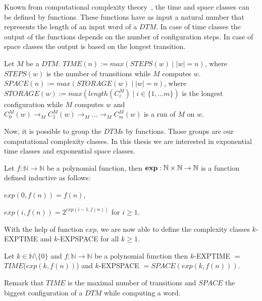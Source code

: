 Known from computational complexity theory~\cite{papadimitriou1994complexity}, the time and space classes
can be defined by functions. These functions have as input a natural number that represents the length of an input
word of a $\mathit{DTM}$. In case of time classes the output of the functions depends on the number of configuration
steps. In case of space classes the output is based on the longest transition.

\begin{definition}
    Let $M$ be a $\mathit{DTM}$. $\mathit{TIME}(n):= max(\mathit{STEPS}(w)\mid |w| = n)$, where $\mathit{STEPS}(w)$
    is the number of transitions while $M$ computes $w$. $\mathit{SPACE}(n) := max(\mathit{STORAGE}(w)\mid |w| = n)$,
    where $\mathit{STORAGE}(w) := max(length(C_i^M)\mid i\in\{1, \dots m\})$ is the longest configuration while $M$
    computes $w$ and $C_0^M(w) \rightarrow_M C_1^M(w) \rightarrow_M \dots \rightarrow_M C_m^M(w)$ is a run of $M$ on
    $w$.
\end{definition}

Now, it is possible to group the $\mathit{DTM}$s by functions. Those groups are our computational complexity classes.
In this thesis we are interested in exponential time classes and exponential space classes.

\begin{definition}
    Let $f: \mathbb{N} \rightarrow \mathbb{N}$ be a polynomial function, then $\emph{exp}: \mathbb{N} \times \mathbb{N}
    \rightarrow \mathbb{N}$ is a function defined inductive as follows:
    \begin{compactitem}
        \item $exp(0, f(n)) = f(n)$,
        \item $exp(i, f(n)) = 2^{exp(i - 1, f(n))}$ for $i \geq 1$.
    \end{compactitem}
\end{definition}

With the help of function $exp$, we are now able to define the complexity classes $k$-EXPTIME and $k$-EXPSPACE for
all $k \geq 1$.

\begin{definition}
    Let $k \in \mathbb{N} \setminus \{0\}$ and $f: \mathbb{N} \rightarrow \mathbb{N}$ be a polynomial function then
    $k$-EXPTIME $=$ $\mathit{TIME}$($exp(k, f(n))$) and $k$-EXPSPACE $= \mathit{SPACE}(exp(k, f(n)))$.
\end{definition}

Remark that $\mathit{TIME}$ is the maximal number of transitions and $\mathit{SPACE}$ the biggest configuration of a
$\mathit{DTM}$ while computing a word.

